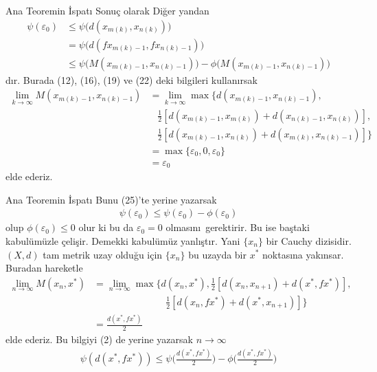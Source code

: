 \documentclass[8pt]{beamer}
\begin{document}
\begin{frame}
 \begin{block}{Ana Teoremin \.{I}spat\i }
Sonu\c{c} olarak 
Di\u{g}er yandan
    \begin{align}
      \psi(\varepsilon_0)&\leq \psi\big(d(x_{m(k)},x_{n(k)})\big)\\ 
      &= \psi\big(d(fx_{m(k)-1},fx_{n(k)-1})\big)\\
      &\leq \psi\big(M(x_{m(k)-1},x_{n(k)-1})\big)-\phi\big(M(x_{m(k)-1},x_{n(k)-1})\big)    \end{align}
d\i r. Burada (12), (16), (19) ve (22) deki bilgileri kullan\i rsak
     \begin{align}
        \lim_{k\to \infty}M(x_{m(k)-1},x_{n(k)-1})&=\lim_{k\to \infty}\max\bigg\{ d(x_{m(k)-1},x_{n(k)-1}),\\
       &\hspace{10pt}\frac{1}{2}[d(x_{m(k)-1},x_{m(k)})+d(x_{n(k)-1},x_{n(k)})],\\
       &\hspace{10pt}\frac{1}{2}[d(x_{m(k)-1},x_{n(k)})+d(x_{m(k)},x_{n(k)-1})] \bigg\}\\
       &=\max\{\varepsilon_0, 0, \varepsilon_0\}\\
       &=\varepsilon_0
     \end{align}
elde ederiz. 
\end{block}
\end{frame}%


\begin{frame}
 \begin{block}{Ana Teoremin \.{I}spat\i }
Bunu (25)'te yerine yazarsak
    \begin{align}
      \psi(\varepsilon_0)\leq\psi(\varepsilon_0)-\phi(\varepsilon_0)
    \end{align}
olup  $\phi(\varepsilon_0)\leq 0$ olur ki bu da $\varepsilon_0=0$ olmas\i n\i\ gerektirir. Bu ise ba\c{s}taki kabul\"um\"uzle \c{c}eli\c{s}ir. Demekki kabul\"um\"uz yanl\i \c{s}t\i r. Yani $\{x_n\}$ bir Cauchy dizisidir. $(X,d)$ tam metrik uzay oldu\u{g}u i\c{c}in $\{x_n\}$ bu uzayda bir $x^*$ noktas\i na yak\i nsar. 
Buradan hareketle
    \begin{align}
      \lim_{n\to \infty}M(x_n, x^*)&=\lim_{n\to \infty}\max\bigg\{ d(x_n,x^*),\frac{1}{2}[ d(x_n,x_{n+1})+ d(x^*,fx^*)],\\
      &\hspace{90pt}\frac{1}{2}[ d(x_n,fx^*)+ d(x^*,x_{n+1})]\bigg\}\\
      & =\frac{d(x^*,fx^*)}{2}
    \end{align}
elde ederiz. Bu bilgiyi (2) de yerine yazarsak $n\to \infty$
\begin{align}
  \psi(d(x^*,fx^*))\leq \psi\bigg(\frac{d(x^*,fx^*)}{2}\bigg)-\phi\bigg(\frac{d(x^*,fx^*)}{2}\bigg) 
\end{align}
\end{block}
\end{frame}%
\end{document}
